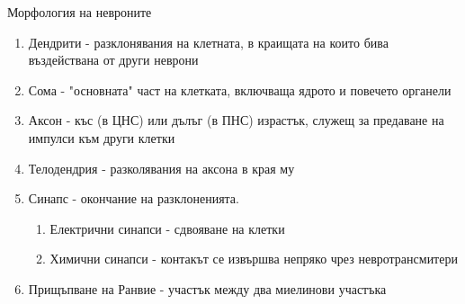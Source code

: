 \begin{frame}[t]{Морфология на невроните}
  \begin{enumerate}
    \item   Дендрити - разклонявания на клетната, в краищата на които бива въздействана от други неврони
    \item   Сома - "основната" част на клетката, включваща ядрото и повечето органели
    \item   Аксон - къс (в ЦНС) или дълъг (в ПНС) израстък, служещ за предаване на импулси към други клетки
    \item   Телодендрия - разколявания на аксона в края му
    \item   Синапс - окончание на разклоненията. 
    \begin{enumerate}
      \item   Електрични синапси - сдвояване на клетки
      \item   Химични синапси - контакът се извършва непряко чрез невротрансмитери
    \end{enumerate}
    \item   Прищъпване на Ранвие - участък между два миелинови участъка
  \end{enumerate}
\end{frame}